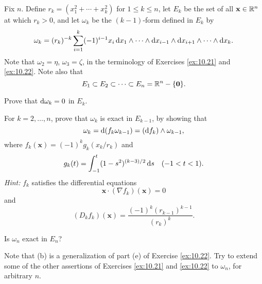 \begin{myexercise}    
    \label{ex:10.23}
    Fix $n$. 
    Define $r_k = (x_1^2 + \cdots + x_k^2)$ for $1 \leq k \leq n$, let $E_k$ be the set of all $\mathbf{x} \in {\protect\mathbb R}^n$ at which $r_k > 0$, and let $\omega_k$ be the $(k - 1)$-form defined in $E_k$ by
    \begin{equation*}
        \omega_k = (r_k)^{-k} \sum_{i=1}^{k} (-1)^{i-1} x_i 
        \d x_1 \wedge \cdots \wedge
        \d x_{i-1} \wedge
        \d x_{i+1} \wedge \cdots \wedge
        \d x_k .
    \end{equation*}
    Note that $\omega_2 = \eta$, $\omega_3 = \zeta$, in the terminology of Exercises \ref{ex:10.21} and \ref{ex:10.22}. 
    Note also that
    \begin{equation*}
        E_1 \subset
        E_2 \subset
        \cdots \subset
        E_n = {\protect\mathbb R}^n - \{\mathbf{0}\} .
    \end{equation*}
    \begin{asparaenum}[(a)]
        \item Prove that $\d \omega_k = 0$ in $E_k$.
        \item For $k=2,\dots,n$, prove that $\omega_k$ is exact in $E_{k-1}$, by showing that 
        \begin{equation*}
            \omega_k = \d (f_k \omega_{k-1}) 
            = (\d f_k) \wedge \omega_{k-1} ,
        \end{equation*}
        where $f_k(\mathbf{x})=(-1)^k g_k(x_k/r_k)$ and 
        \begin{equation*}
            g_k(t)=\int_{-1}^{t}(1-s^2)^{(k-3)/2} \d s
            \quad (-1<t<1).
        \end{equation*}
        \emph{Hint:} $f_k$ satisfies the differential equations 
        \begin{equation*}
            \mathbf{x} \cdot (\nabla f_k)(\mathbf{x}) = 0
        \end{equation*}
        and 
        \begin{equation*}
            (D_k f_k)(\mathbf{x}) = \frac{(-1)^k(r_{k-1})^{k-1}}{(r_k)^k}.
        \end{equation*}
        \item Is $\omega_n$ exact in $E_n$?
        \item Note that (b) is a generalization of part (e) of Exercise \ref{ex:10.22}. 
        Try to extend some of the other assertions of Exercises \ref{ex:10.21} and \ref{ex:10.22} to $\omega_n$, for arbitrary $n$.
    \end{asparaenum}
\end{myexercise}


